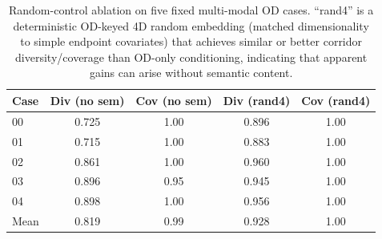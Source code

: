 \begin{table}[t]
  \centering
  \small
  \begin{tabular}{lcc|cc}
    \toprule
    Case & Div (no sem) & Cov (no sem) & Div (rand4) & Cov (rand4) \\
    \midrule
    00 & 0.725 & 1.00 & 0.896 & 1.00 \\
    01 & 0.715 & 1.00 & 0.883 & 1.00 \\
    02 & 0.861 & 1.00 & 0.960 & 1.00 \\
    03 & 0.896 & 0.95 & 0.945 & 1.00 \\
    04 & 0.898 & 1.00 & 0.956 & 1.00 \\
    \midrule
    Mean & 0.819 & 0.99 & 0.928 & 1.00 \\
    \bottomrule
  \end{tabular}
  \caption{Random-control ablation on five fixed multi-modal OD cases. ``rand4'' is a deterministic OD-keyed 4D random embedding (matched dimensionality to simple endpoint covariates) that achieves similar or better corridor diversity/coverage than OD-only conditioning, indicating that apparent gains can arise without semantic content.}
  \label{tab:semantic-ablation}
\end{table}
